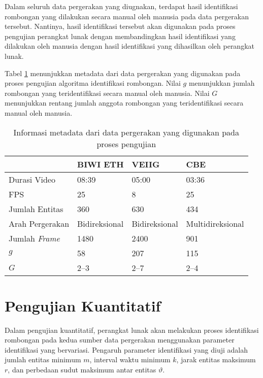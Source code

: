 Dalam seluruh data pergerakan yang diugnakan, terdapat hasil identifikasi rombongan yang dilakukan secara manual oleh manusia pada data pergerakan tersebut. Nantinya, hasil identifikasi tersebut akan digunakan pada proses pengujian perangkat lunak dengan membandingkan hasil identifikasi yang dilakukan oleh manusia dengan hasil identifikasi yang dihasilkan oleh perangkat lunak.

Tabel \ref{bab6:metadata-pergerakan} menunjukkan metadata dari data pergerakan yang digunakan pada proses pengujian algoritma identifikasi rombongan. Nilai $g$ menunjukkan jumlah rombongan yang teridentifikasi secara manual oleh manusia. Nilai $G$ menunjukkan rentang jumlah anggota rombongan yang teridentifikasi secara manual oleh manusia.

\begin{table}[t]
    \centering
    \begin{tabular}{p{3cm} p{2.5cm} p{2.5cm} p{2.5cm}}
        \hline
        & \textbf{BIWI ETH} & \textbf{VEIIG} & \textbf{CBE} \\
        \hline
        Durasi Video & 08:39 & 05:00 & 03:36 \\
        FPS & 25 & 8 & 25 \\
        Jumlah Entitas & 360 & 630 & 434 \\
        Arah Pergerakan & Bidireksional & Bidireksional & Multidireksional \\
        Jumlah \textit{Frame} & 1480 & 2400 & 901 \\
        $g$ & 58 & 207 & 115 \\
        $G$ & 2--3 & 2--7 & 2--4 \\
        \hline
    \end{tabular}
    \caption[Metadata sumber data pergerakan]{Informasi metadata dari data pergerakan yang digunakan pada proses pengujian}
    \label{bab6:metadata-pergerakan}
\end{table}

\section{Pengujian Kuantitatif}
\label{sec:quantitative}

Dalam pengujian kuantitatif, perangkat lunak akan melakukan proses identifikasi rombongan pada kedua sumber data pergerakan menggunakan parameter identifikasi yang bervariasi. Pengaruh parameter identifikasi yang diuji adalah jumlah entitas minimum $m$, interval waktu minimum $k$, jarak entitas maksimum $r$, dan perbedaan sudut maksimum antar entitas $\vartheta$. 

